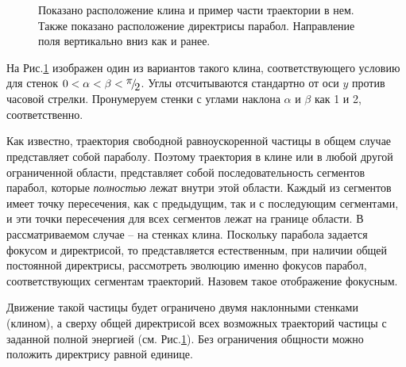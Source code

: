 \documentclass[a4paper]{article}
\begin{document}

\begin{figure}[h]
\caption{Показано расположение клина и пример части траектории в нем. Также показано расположение директрисы парабол. Направление поля вертикально вниз как и ранее.}
\label{image4}
\end{figure}
На Рис.\ref{image4} изображен один из вариантов такого клина, соответствующего условию для стенок $0<\alpha <\beta <{\raise0.7ex\hbox{$ \pi  $}\!\mathord{\left/ {\vphantom {\pi  2}} \right. \kern-\nulldelimiterspace}\!\lower0.7ex\hbox{$ 2 $}} $. Углы отсчитываются стандартно от оси $y$ против часовой стрелки. Пронумеруем стенки с углами наклона $\alpha $ и $\beta $ как 1 и 2, соответственно.


Как известно, траектория свободной равноускоренной частицы в общем случае представляет собой параболу. Поэтому траектория в клине или в любой другой ограниченной области, представляет собой последовательность сегментов парабол, которые \textit{полностью} лежат внутри этой области. Каждый из сегментов имеет точку пересечения, как с предыдущим, так и с последующим сегментами, и эти точки пересечения для всех сегментов лежат на границе области. В рассматриваемом случае -- на стенках клина. Поскольку парабола задается фокусом и директрисой, то представляется естественным, при наличии общей постоянной директрисы, рассмотреть эволюцию именно фокусов парабол, соответствующих сегментам траекторий. Назовем такое отображение фокусным.


Движение такой частицы будет ограничено двумя наклонными стенками (клином), а сверху общей директрисой всех возможных траекторий частицы с заданной полной энергией (см. Рис.\ref{image4}). Без ограничения общности можно положить директрису равной единице.
\end{document}
